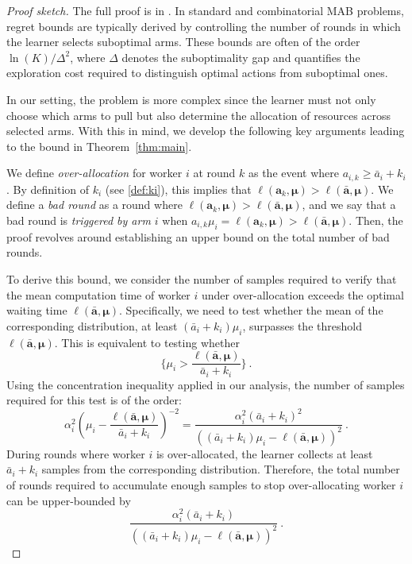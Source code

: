 \begin{proof}[Proof sketch]
	
The full proof is in . In standard and combinatorial MAB problems, regret bounds are typically derived by controlling the number of rounds in which the learner selects suboptimal arms. These bounds are often of the order $\ln(K)/\Delta^2$, where $\Delta$ denotes the suboptimality gap and quantifies the exploration cost required to distinguish optimal actions from suboptimal ones.

In our setting, the problem is more complex since the learner must not only choose which arms to pull but also determine the allocation of resources across selected arms. With this in mind, we develop the following key arguments leading to the bound in Theorem~\ref{thm:main}.  

We define \textit{over-allocation} for worker $i$ at round $k$ as the event where $a_{i,k} \geq \bar{a}_i + k_i$. By definition of $k_i$ (see \eqref{def:ki}), this implies that $\ell(\bm{a}_k, \bm{\mu}) > \ell(\bar{\bm{a}}, \bm{\mu})$. We define a \textit{bad round} as a round where $\ell(\bm{a}_k, \bm{\mu}) > \ell(\bar{\bm{a}}, \bm{\mu})$, and we say that a bad round is \textit{triggered by arm $i$} when $a_{i,k} \mu_i = \ell(\bm{a}_k, \bm{\mu}) > \ell(\bar{\bm{a}}, \bm{\mu})$. Then, the proof revolves around establishing an upper bound on the total number of bad rounds.

To derive this bound, we consider the number of samples required to verify that the mean computation time of worker $i$ under over-allocation exceeds the optimal waiting time $\ell(\bar{\bm{a}}, \bm{\mu})$. Specifically, we need to test whether the mean of the corresponding distribution, at least $(\bar{a}_i + k_i)\mu_i$, surpasses the threshold $\ell(\bar{\bm{a}}, \bm{\mu})$. This is equivalent to testing whether 
$$
\{ \mu_i > \frac{\ell(\bar{\bm{a}}, \bm{\mu})}{\bar{a}_i + k_i}\}~.
$$
Using the concentration inequality applied in our analysis, the number of samples required for this test is of the order:  
\begin{equation}\label{eq:n_rounds}
	\textstyle
	\alpha_i^2 \left(\mu_i - \frac{\ell(\bar{\bm{a}}, \bm{\mu})}{\bar{a}_i + k_i}\right)^{-2} = \frac{\alpha_i^2 (\bar{a}_i + k_i)^2}{\left((\bar{a}_i + k_i)\mu_i - \ell(\bar{\bm{a}}, \bm{\mu})\right)^2}~.
\end{equation}
During rounds where worker $i$ is over-allocated, the learner collects at least $\bar{a}_i + k_i$ samples from the corresponding distribution. Therefore, the total number of rounds required to accumulate enough samples to stop over-allocating worker $i$ can be upper-bounded by 
$$
	\frac{\alpha_i^2 (\bar{a}_i + k_i)}{\left((\bar{a}_i + k_i)\mu_i - \ell(\bar{\bm{a}}, \bm{\mu})\right)^2}~.
$$


\end{proof}
